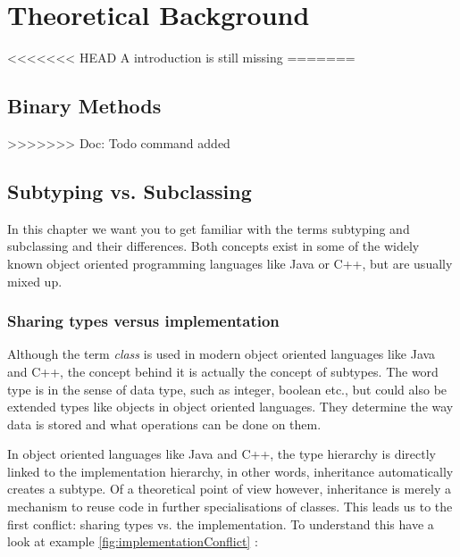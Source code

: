 
\part{Theoretical Background}
<<<<<<< HEAD
A introduction is still missing
=======
\chapter{Binary Methods}
>>>>>>> Doc: Todo command added

\chapter{Subtyping vs. Subclassing}
\label{chap:subtypingVsSubclassing}
In this chapter we want you to get familiar with the terms subtyping
and subclassing and their differences. Both concepts exist in some of
the widely known object oriented programming languages like Java or C++,
but are usually mixed up.

\section{Sharing types versus implementation}
\label{sec:sharingTypes}

Although the term \emph{class} is used in modern object oriented
languages like Java and C++, the concept behind it is actually the
concept of subtypes.	The word type is in the sense of data type, such
as integer, boolean etc., but could also be extended types like objects
in object oriented languages. They determine the way data is stored and
what operations can be done on them.

In object oriented languages like Java and C++, the type hierarchy
is directly linked to the implementation hierarchy, in other words,
inheritance automatically creates a subtype. Of a theoretical point
of view however, inheritance is merely a mechanism to reuse code in
further specialisations of classes. This leads us to the first conflict:
sharing types vs. the implementation. To understand this have a look at
example \ref{fig:implementationConflict} \cite{simons_theory_2003-4}:

